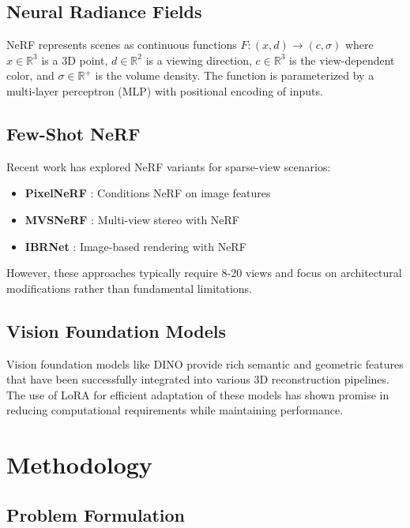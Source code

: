 \documentclass[11pt]{article}
\begin{document}
\subsection{Neural Radiance Fields}

NeRF represents scenes as continuous functions $F: (x, d) \rightarrow (c, \sigma)$ where $x \in \mathbb{R}^3$ is a 3D point, $d \in \mathbb{R}^2$ is a viewing direction, $c \in \mathbb{R}^3$ is the view-dependent color, and $\sigma \in \mathbb{R}^+$ is the volume density. The function is parameterized by a multi-layer perceptron (MLP) with positional encoding of inputs.

\subsection{Few-Shot NeRF}

Recent work has explored NeRF variants for sparse-view scenarios:
\begin{itemize}
    \item \textbf{PixelNeRF} \cite{yu2021pixelnerf}: Conditions NeRF on image features
    \item \textbf{MVSNeRF} \cite{chen2021mvsnerf}: Multi-view stereo with NeRF
    \item \textbf{IBRNet} \cite{wang2021ibrnet}: Image-based rendering with NeRF
\end{itemize}

However, these approaches typically require 8-20 views and focus on architectural modifications rather than fundamental limitations.

\subsection{Vision Foundation Models}

Vision foundation models like DINO \cite{caron2021emerging} provide rich semantic and geometric features that have been successfully integrated into various 3D reconstruction pipelines. The use of LoRA \cite{hu2021lora} for efficient adaptation of these models has shown promise in reducing computational requirements while maintaining performance.

\section{Methodology}

\subsection{Problem Formulation}
\end{document}
